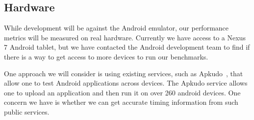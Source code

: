 \subsection*{Hardware}

While development will be against the Android emulator, our performance
	metrics will be measured on real hardware.
Currently we have access to a Nexus 7 Android tablet, but we have contacted
	the Android development team to find if there is a way to get
	access to more devices to run our benchmarks.

One approach we will consider is using existing services,
	such as Apkudo~\cite{apkudo}, that allow one to test Android
	applications across devices.
The Apkudo service allows one to upload an application and then run it on 
	over 260 android devices.
One concern we have is whether we can get accurate timing information from
    such public services.

